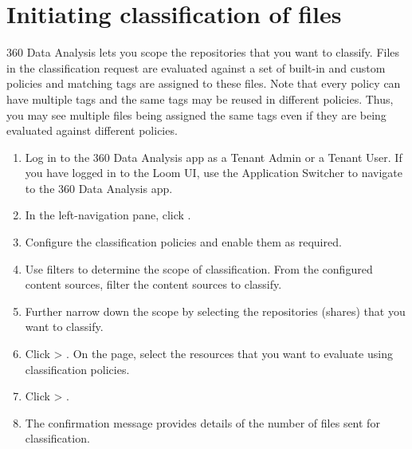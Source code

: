 \documentclass[letterpaper,10pt,english]{sphinxmanual}
\begin{document}
\section{Initiating classification of files}
\label{\detokenize{mcdmp_app_ug:initiating-classification-of-files}}
360 Data Analysis lets you scope the repositories that you want to classify. Files in the classification request are evaluated against a set of built-in and custom policies
and matching tags are assigned to these files. Note that every policy can have multiple tags and the same tags may be reused in different policies.
Thus, you may see multiple files being assigned the same tags even if they are being evaluated against different policies.

\begin{enumerate}
\item {} 
Log in to the 360 Data Analysis app as a Tenant Admin or a Tenant User. If you have logged in to the Loom UI, use the Application Switcher to navigate to the 360 Data Analysis app.

\item {} 
In the left-navigation pane, click .

\item {} 
Configure the classification policies and enable them as required.

\item {} 
Use filters to determine the scope of classification. From the configured content sources, filter the content sources to classify.

\item {} 
Further narrow down the scope by selecting the repositories (shares) that you want to classify.

\item {} 
Click  \textgreater{} . On the  page, select the resources that you want to evaluate using classification policies.

\item {} 
Click  \textgreater{} .

\item {} 
The confirmation message provides details of the number of files sent for classification.

\end{enumerate}
\begin{quote}

\begin{figure}[htbp]
\centering

\noindent{}
\end{figure}
\end{quote}
\end{document}
